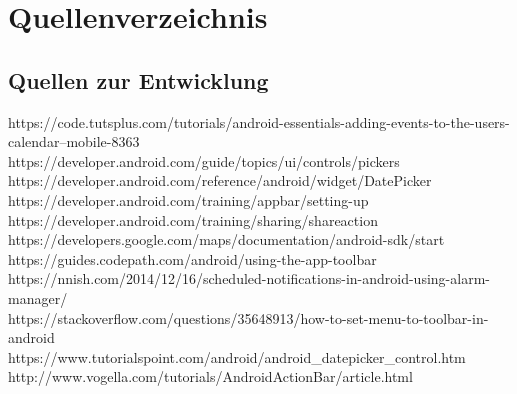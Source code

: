 \section{Quellenverzeichnis}


\subsection{Quellen zur Entwicklung}

https://code.tutsplus.com/tutorials/android-essentials-adding-events-to-the-users-calendar--mobile-8363\\
https://developer.android.com/guide/topics/ui/controls/pickers\\
https://developer.android.com/reference/android/widget/DatePicker\\
https://developer.android.com/training/appbar/setting-up\\
https://developer.android.com/training/sharing/shareaction\\
https://developers.google.com/maps/documentation/android-sdk/start\\
https://guides.codepath.com/android/using-the-app-toolbar\\
https://nnish.com/2014/12/16/scheduled-notifications-in-android-using-alarm-manager/\\
https://stackoverflow.com/questions/35648913/how-to-set-menu-to-toolbar-in-android\\
https://www.tutorialspoint.com/android/android\_datepicker\_control.htm\\
http://www.vogella.com/tutorials/AndroidActionBar/article.html\\

